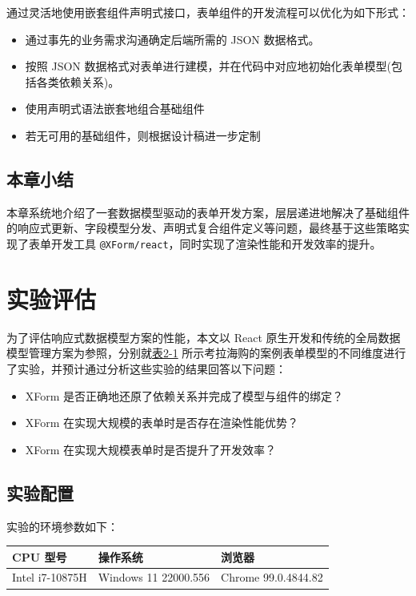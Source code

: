 \documentclass[winfonts,master,twoside]{njuthesis}
\makeatletter
\newcommand{\xform}[1]{\texttt{@XForm/#1}}
\makeatother
\begin{document}
通过灵活地使用嵌套组件声明式接口，表单组件的开发流程可以优化为如下形式：

\begin{itemize}
    \item 通过事先的业务需求沟通确定后端所需的 JSON 数据格式。
    \item 按照 JSON 数据格式对表单进行建模，并在代码中对应地初始化表单模型(包括各类依赖关系)。
    \item 使用声明式语法嵌套地组合基础组件
    \item 若无可用的基础组件，则根据设计稿进一步定制
\end{itemize}

\section{本章小结}\label{chapter-4-conclusion}

本章系统地介绍了一套数据模型驱动的表单开发方案，层层递进地解决了基础组件的响应式更新、字段模型分发、声明式复合组件定义等问题，最终基于这些策略实现了表单开发工具 \xform{react}，同时实现了渲染性能和开发效率的提升。

\chapter{实验评估}\label{experiment-examine}

为了评估响应式数据模型方案的性能，本文以 React 原生开发和传统的全局数据模型管理方案为参照，分别就\hyperref[kaola-activity-configuration-form-model]{表2-1} 所示考拉海购的案例表单模型的不同维度进行了实验，并预计通过分析这些实验的结果回答以下问题：

\begin{itemize}
    \item XForm 是否正确地还原了依赖关系并完成了模型与组件的绑定？
    \item XForm 在实现大规模的表单时是否存在渲染性能优势？
    \item XForm 在实现大规模表单时是否提升了开发效率？
\end{itemize}

\section{实验配置}

实验的环境参数如下：

\begin{table}[h]
    \centering
    \begin{tabular}{|l|l|l|}
        \hline
        CPU 型号        & 操作系统             & 浏览器              \\ \hline
        Intel i7-10875H & Windows 11 22000.556 & Chrome 99.0.4844.82 \\ \hline
    \end{tabular}
\end{table}
\end{document}
